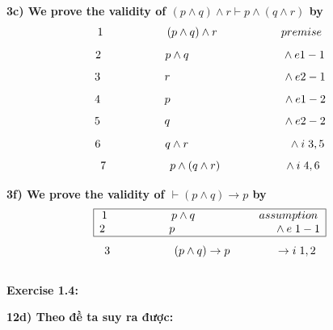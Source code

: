 \documentclass[a4paper]{article}
\begin{document}
\textbf{{\large\hspace{1 cm} 3c) We prove the validity of $(p \wedge q) \wedge r \vdash p \wedge (q \wedge r)$ by}}
{\large $$1 \hspace{2 cm} (p \wedge q) \wedge r \hspace{2 cm} premise$$ $$2 \hspace{2 cm}  p \wedge q \hspace{2.9 cm} \wedge e 1-1 $$
$$3 \hspace{2 cm} r \hspace{3.5 cm} \wedge e 2-1 $$
$$4 \hspace{2 cm} p \hspace{3.5 cm} \wedge e 1-2 $$
$$5 \hspace{2 cm} q \hspace{3.5 cm} \wedge e 2-2 $$
$$6 \hspace{2 cm} q \wedge r \hspace{3.1 cm} \wedge i \hspace{0.1cm} 3,5 $$
$$7 \hspace{2 cm} p \wedge ( q \wedge r) \hspace{2 cm} \wedge i \hspace{0.1 cm}4,6$$}

\textbf{{\large\hspace{1 cm} 3f) We prove the validity of $\vdash ( p \wedge q) \rightarrow p $ by}}
{\large $$\begin{array}{|c|}
\hline 
\textcolor{black}{1 \hspace{2 cm} p \wedge q \hspace{2 cm} assumption}\\
\textcolor{black}{2 \hspace{2 cm}  p \hspace{3.1 cm} \wedge e \hspace{0.1 cm} 1-1}\\
\hline
\end{array}$$
$$3 \hspace{2 cm} ( p \wedge q) \rightarrow p \hspace{1.4 cm} \rightarrow i \hspace{0.1 cm} 1,2$$}\\

\textbf{\large\hspace{0.5cm} Exercise 1.4:}

\textbf{\large\hspace{1cm}12d) Theo đề ta suy ra được:\\}
\end{document}
